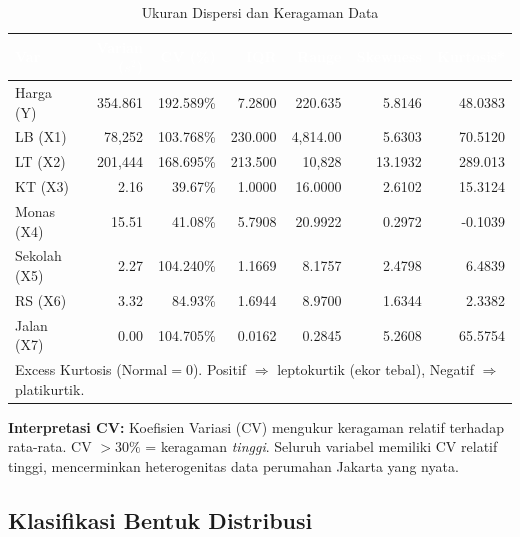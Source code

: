 \documentclass[12pt,a4paper]{article}
\begin{document}
\begin{table}[H]
\centering
\caption{Ukuran Dispersi dan Keragaman Data}
\label{tab:dispersi}
\small
\setlength{\tabcolsep}{6pt}
\begin{tabular}{lrrrrrr}
\toprule
\rowcolor{headerblue}
\textcolor{white}{\textbf{Var}} &
\textcolor{white}{\textbf{Varian ($s^2$)}} &
\textcolor{white}{\textbf{CV (\%)}} &
\textcolor{white}{\textbf{IQR}} &
\textcolor{white}{\textbf{Range}} &
\textcolor{white}{\textbf{Skewness}} &
\textcolor{white}{\textbf{Kurtosis*}} \\
\midrule
\rowcolor{rowlight}
Harga (Y) & 354.861 & 192.589\% & 7.2800 & 220.635 & 5.8146 & 48.0383 \\
LB (X1) & 78,252 & 103.768\% & 230.000 & 4,814.00 & 5.6303 & 70.5120 \\
\rowcolor{rowlight}
LT (X2) & 201,444 & 168.695\% & 213.500 & 10,828 & 13.1932 & 289.013 \\
KT (X3) & 2.16 & 39.67\% & 1.0000 & 16.0000 & 2.6102 & 15.3124 \\
\rowcolor{rowlight}
Monas (X4) & 15.51 & 41.08\% & 5.7908 & 20.9922 & 0.2972 & -0.1039 \\
Sekolah (X5) & 2.27 & 104.240\% & 1.1669 & 8.1757 & 2.4798 & 6.4839 \\
\rowcolor{rowlight}
RS (X6) & 3.32 & 84.93\% & 1.6944 & 8.9700 & 1.6344 & 2.3382 \\
Jalan (X7) & 0.00 & 104.705\% & 0.0162 & 0.2845 & 5.2608 & 65.5754 \\
\bottomrule
\multicolumn{7}{l}{\footnotesize *Excess Kurtosis (Normal$=0$).
  Positif $\Rightarrow$ leptokurtik (ekor tebal), Negatif $\Rightarrow$ platikurtik.}
\end{tabular}
\end{table}

\noindent\textbf{Interpretasi CV:} Koefisien Variasi (CV) mengukur keragaman relatif terhadap
rata-rata. CV $>30\%$ = keragaman \textit{tinggi}. Seluruh variabel memiliki CV relatif
tinggi, mencerminkan heterogenitas data perumahan Jakarta yang nyata.

\subsection{Klasifikasi Bentuk Distribusi}
\end{document}
